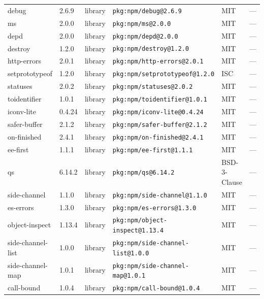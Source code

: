 \documentclass[11pt,a4paper]{article}
\begin{document}
\begin{longtable}{|p{4cm}|p{2cm}|p{1.6cm}|p{5cm}|p{1.5cm}|p{3.5cm}|}
\raggedright debug & 2.6.9 & library & \small\texttt{pkg:npm/debug@2.6.9} & MIT & \small — \\
\raggedright ms & 2.0.0 & library & \small\texttt{pkg:npm/ms@2.0.0} & MIT & \small — \\
\raggedright depd & 2.0.0 & library & \small\texttt{pkg:npm/depd@2.0.0} & MIT & \small — \\
\raggedright destroy & 1.2.0 & library & \small\texttt{pkg:npm/destroy@1.2.0} & MIT & \small — \\
\raggedright http-errors & 2.0.1 & library & \small\texttt{pkg:npm/http-errors@2.0.1} & MIT & \small — \\
\raggedright setprototypeof & 1.2.0 & library & \small\texttt{pkg:npm/setprototypeof@1.2.0} & ISC & \small — \\
\raggedright statuses & 2.0.2 & library & \small\texttt{pkg:npm/statuses@2.0.2} & MIT & \small — \\
\raggedright toidentifier & 1.0.1 & library & \small\texttt{pkg:npm/toidentifier@1.0.1} & MIT & \small — \\
\raggedright iconv-lite & 0.4.24 & library & \small\texttt{pkg:npm/iconv-lite@0.4.24} & MIT & \small — \\
\raggedright safer-buffer & 2.1.2 & library & \small\texttt{pkg:npm/safer-buffer@2.1.2} & MIT & \small — \\
\raggedright on-finished & 2.4.1 & library & \small\texttt{pkg:npm/on-finished@2.4.1} & MIT & \small — \\
\raggedright ee-first & 1.1.1 & library & \small\texttt{pkg:npm/ee-first@1.1.1} & MIT & \small — \\
\raggedright qs & 6.14.2 & library & \small\texttt{pkg:npm/qs@6.14.2} & BSD-3-Clause & \small — \\
\raggedright side-channel & 1.1.0 & library & \small\texttt{pkg:npm/side-channel@1.1.0} & MIT & \small — \\
\raggedright es-errors & 1.3.0 & library & \small\texttt{pkg:npm/es-errors@1.3.0} & MIT & \small — \\
\raggedright object-inspect & 1.13.4 & library & \small\texttt{pkg:npm/object-inspect@1.13.4} & MIT & \small — \\
\raggedright side-channel-list & 1.0.0 & library & \small\texttt{pkg:npm/side-channel-list@1.0.0} & MIT & \small — \\
\raggedright side-channel-map & 1.0.1 & library & \small\texttt{pkg:npm/side-channel-map@1.0.1} & MIT & \small — \\
\raggedright call-bound & 1.0.4 & library & \small\texttt{pkg:npm/call-bound@1.0.4} & MIT & \small — \\

\end{longtable}
\end{document}
